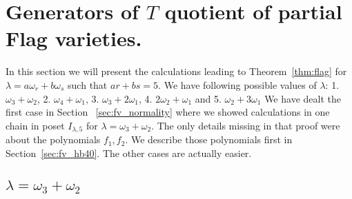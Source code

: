 \section{Generators of \(T\) quotient of partial Flag varieties.}
\label{sec:fv_hb}

In this section we will present the calculations leading to Theorem~\ref{thm:flag} for \(\lambda=a\omega_r+b\omega_s\) such that \(ar+bs = 5\). We have following possible values of \(\lambda\): 1. \(\omega_3+\omega_2\), 2. \(\omega_4+\omega_1\), 3. \(\omega_3+2\omega_1\), 4. \(2\omega_2+\omega_1\) and 5. \(\omega_2+3\omega_1\) We have dealt the first case in Section ~\ref{sec:fv_normality} where we showed calculations in one chain in poset \(I_{\lambda,5}\) for \(\lambda = \omega_3+\omega_2\).  The only details missing in that proof were about the polynomials $f_1, f_2$. We describe those polynomials first in Section~\ref{sec:fv_hb40}. The other cases are actually easier.
\subsection{$\lambda=\omega_3+\omega_2$}
